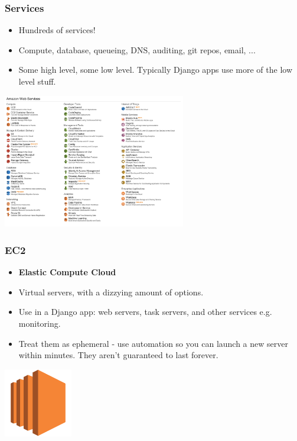 \documentclass{beamer}
\begin{document}
\begin{frame}[fragile]\frametitle{Services}

    \begin{itemize}
        \item Hundreds of services!
        \item Compute, database, queueing, DNS, auditing, git repos, email, ...
        \item Some high level, some low level. Typically Django apps use more of the low level stuff.
    \end{itemize}

    \begin{center}
        \includegraphics[width=8cm]{aws-services}
    \end{center}

\end{frame}


\begin{frame}[fragile]\frametitle{EC2}

    \begin{itemize}
        \item \textbf{Elastic Compute Cloud}
        \item Virtual servers, with a dizzying amount of options.
        \item Use in a Django app: web servers, task servers, and other services e.g. monitoring.
        \item Treat them as ephemeral - use automation so you can launch a new server within minutes. They aren't guaranteed to last forever.
    \end{itemize}

    \begin{center}
        \includegraphics[width=3cm]{aws-ec2}
    \end{center}

\end{frame}
\end{document}
